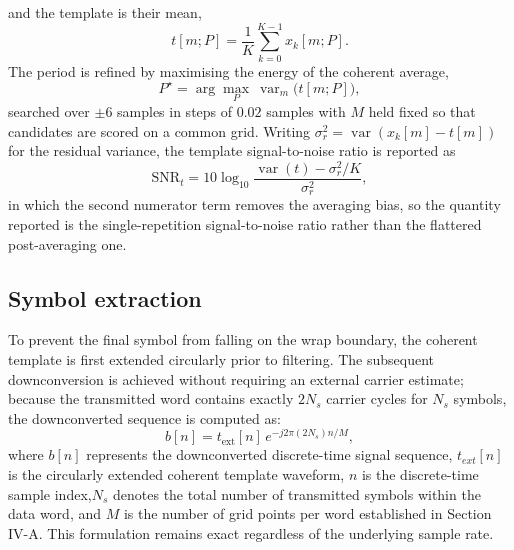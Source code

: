 \documentclass[journal]{IEEEtran}   %
\begin{document}
and the template is their mean,
\begin{equation}
t[m;P] = \frac{1}{K}\sum_{k=0}^{K-1} x_k[m;P].
\label{eq:template}
\end{equation}
The period is refined by maximising the energy of the coherent average,
\begin{equation}
P^{\star} = \arg\max_{P} \ \operatorname{var}_m\big(t[m; P]\big),
\label{eq:period}
\end{equation}
searched over $\pm 6$ samples in steps of $0.02$ samples with $M$ held fixed so
that candidates are scored on a common grid. Writing
$\sigma_r^2 = \operatorname{var}(x_k[m] - t[m])$ for the residual variance, the
template signal-to-noise ratio is reported as
\begin{equation}
\mathrm{SNR}_t = 10\log_{10}
\frac{\operatorname{var}(t) - \sigma_r^2/K}{\sigma_r^2},
\label{eq:tsnr}
\end{equation}
in which the second numerator term removes the averaging bias, so the quantity
reported is the single-repetition signal-to-noise ratio rather than the
flattered post-averaging one.

\subsection{Symbol extraction}
To prevent the final symbol from falling on the wrap boundary, the coherent template is first extended circularly prior to filtering. The subsequent downconversion is achieved without requiring an external carrier estimate; because the transmitted word contains exactly $2N_s$ carrier cycles for $N_s$ symbols, the downconverted sequence is computed as:
\begin{equation}
b[n] = t_{\mathrm{ext}}[n] \, e^{-j 2\pi (2N_s) n / M},
\label{eq:downconv}
\end{equation}
where $b[n]$ represents the downconverted discrete-time signal sequence, $t_{ext}[n]$ is the circularly extended coherent template waveform, $n$ is the discrete-time sample index,$N_s$ denotes the total number of transmitted symbols within the data word, and $M$ is the number of grid points per word established in Section IV-A. This formulation remains exact regardless of the underlying sample rate. 
\end{document}
